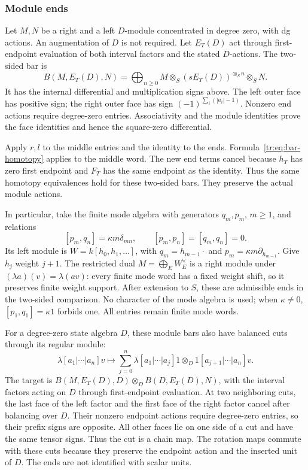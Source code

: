 \subsubsection{Module ends}

Let \(M,N\) be a right and a left \(D\)-module concentrated
in degree zero, with dg actions.  An augmentation of \(D\) is
not required.  Let \(E_T(D)\) act through first-endpoint
evaluation of both interval factors and the stated \(D\)-actions.
The two-sided bar is
\[
 B(M,E_T(D),N)=\bigoplus_{n\ge0}
 M\otimes_S(sE_T(D))^{\otimes_S n}\otimes_S N.
\]
It has the internal differential and multiplication signs above.
The left outer face has positive sign; the right outer face has
sign \((-1)^{\sum_i(|a_i|-1)}\).  Nonzero end actions
require degree-zero entries.  Associativity and the module identities
prove the face identities and hence the square-zero differential.

Apply \(r,l\) to the middle entries and the identity to the
ends.  Formula~\eqref{tr:eq:bar-homotopy} applies to the middle
word.  The new end terms cancel because \(h_T\) has zero
first endpoint and \(F_T\) has the same endpoint as the identity.
Thus the same homotopy equivalences hold for these two-sided bars.
They preserve the actual module actions.

In particular, take the finite mode algebra with generators
\(q_m,p_m\), \(m\ge1\), and relations
\[
 [p_m,q_n]=\kappa m\delta_{mn},\qquad
 [p_m,p_n]=[q_m,q_n]=0.
\]
Its left module is \(W=k[h_0,h_1,\ldots]\), with
\(q_m=h_{m-1}\cdot\) and
\(p_m=\kappa m\partial_{h_{m-1}}\).  Give \(h_j\)
weight \(j+1\).  The restricted dual
\(M=\bigoplus_E W_E^\vee\) is a right module under
\((\lambda a)(v)=\lambda(av)\): every finite mode word
has a fixed weight shift, so it preserves finite weight support.
After extension to \(S\), these are admissible ends in the
two-sided comparison.  No character of the mode algebra is used;
when \(\kappa\ne0\), \([p_1,q_1]=\kappa1\) forbids one.
All entries remain finite mode words.

For a degree-zero state algebra \(D\), these module bars also
have balanced cuts through its regular module:
\[
 \lambda[a_1|\cdots|a_n]v\longmapsto
 \sum_{j=0}^n\lambda[a_1|\cdots|a_j]1
     \otimes_D1[a_{j+1}|\cdots|a_n]v.
\]
The target is
\(B(M,E_T(D),D)\otimes_D B(D,E_T(D),N)\), with the
interval factors acting on \(D\) through first-endpoint
evaluation.  At two neighboring cuts, the last face of the left
factor and the first face of the right factor cancel after
balancing over \(D\).  Their nonzero endpoint actions require
degree-zero entries, so their prefix signs are opposite.  All other
faces lie on one side of a cut and have the same tensor signs.
Thus the cut is a chain map.  The rotation maps commute with these
cuts because they preserve the endpoint action and the inserted
unit of \(D\).  The ends are not identified with scalar units.

